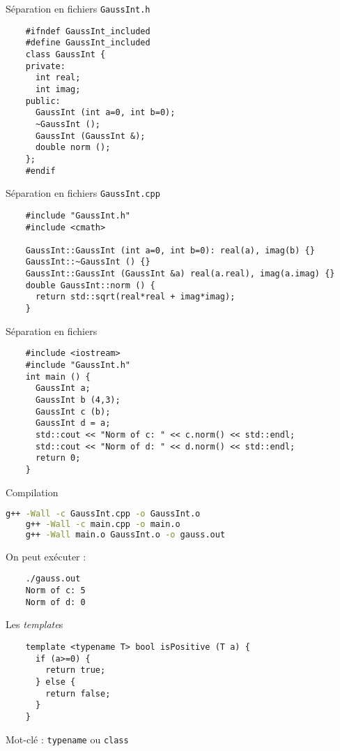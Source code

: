 \begin{frame}[fragile]{Séparation en fichiers}
  \texttt{GaussInt.h}
  \begin{lstlisting}
    #ifndef GaussInt_included
    #define GaussInt_included
    class GaussInt {
    private:
      int real;
      int imag;
    public:
      GaussInt (int a=0, int b=0);
      ~GaussInt ();
      GaussInt (GaussInt &);
      double norm ();
    };
    #endif
  \end{lstlisting}
\end{frame}

\begin{frame}[fragile]{Séparation en fichiers}
  \texttt{GaussInt.cpp}
  \begin{lstlisting}
    #include "GaussInt.h"
    #include <cmath>

    GaussInt::GaussInt (int a=0, int b=0): real(a), imag(b) {}
    GaussInt::~GaussInt () {}
    GaussInt::GaussInt (GaussInt &a) real(a.real), imag(a.imag) {}
    double GaussInt::norm () {
      return std::sqrt(real*real + imag*imag);
    }
  \end{lstlisting}
\end{frame}

\begin{frame}[fragile]{Séparation en fichiers}
  \begin{lstlisting}
    #include <iostream>
    #include "GaussInt.h"
    int main () {
      GaussInt a;
      GaussInt b (4,3);
      GaussInt c (b);
      GaussInt d = a;
      std::cout << "Norm of c: " << c.norm() << std::endl;
      std::cout << "Norm of d: " << d.norm() << std::endl;
      return 0;
    }
  \end{lstlisting}
\end{frame}

\begin{frame}[fragile]{Compilation}
  \begin{lstlisting}[language=bash]
    g++ -Wall -c GaussInt.cpp -o GaussInt.o
    g++ -Wall -c main.cpp -o main.o
    g++ -Wall main.o GaussInt.o -o gauss.out
  \end{lstlisting}

  On peut exécuter :
  \begin{lstlisting}
    ./gauss.out
    Norm of c: 5
    Norm of d: 0
  \end{lstlisting}
\end{frame}

\begin{frame}[fragile]{Les \textit{template}s}
  \begin{lstlisting}
    template <typename T> bool isPositive (T a) {
      if (a>=0) {
        return true;
      } else {
        return false;
      }
    }
  \end{lstlisting}

  Mot-clé : \texttt{typename} ou \texttt{class}
\end{frame}

